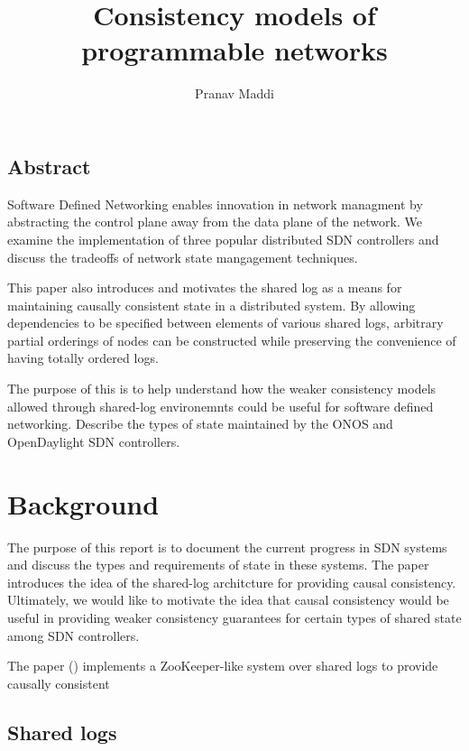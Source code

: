 \documentclass[letterpaper,twocolumn,10pt]{article}
\begin{document}
\title{\Large Consistency models of programmable networks}

\author{Pranav Maddi}

\date{}
\maketitle

\tableofcontents

\subsection*{Abstract}

Software Defined Networking enables innovation in network managment by abstracting the control plane away from the data plane of the network. We examine the implementation of three popular distributed SDN controllers and discuss the tradeoffs of network state mangagement techniques.

This paper also introduces and motivates the shared log as a means for maintaining causally consistent state in a distributed system.
By allowing dependencies to be specified between elements of various shared logs, arbitrary partial orderings of nodes can be constructed while preserving the convenience of having totally ordered logs.

The purpose of this is to help understand how the weaker consistency models allowed through shared-log environemnts could be useful for software defined networking.
Describe the types of state maintained by the ONOS and OpenDaylight SDN controllers.

\section{Background}

The purpose of this report is to document the current progress in SDN systems and discuss the types and requirements of state in these systems. The paper introduces the idea of the shared-log architcture for providing causal consistency. Ultimately, we would like to motivate the idea that causal consistency would be useful in providing weaker consistency guarantees for certain types of shared state among SDN controllers.

The paper () implements a ZooKeeper-like system over shared logs to provide causally consistent 

\subsection{Shared logs}
\end{document}
